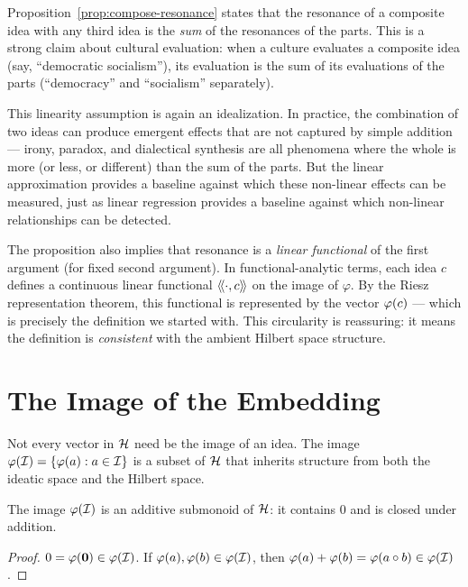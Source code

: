 \begin{interpretation}
\label{interp:linearity}
Proposition~\ref{prop:compose-resonance} states that the resonance of a
composite idea with any third idea is the \emph{sum} of the resonances of the
parts. This is a strong claim about cultural evaluation: when a culture
evaluates a composite idea (say, ``democratic socialism''), its evaluation
is the sum of its evaluations of the parts (``democracy'' and ``socialism''
separately).

This linearity assumption is again an idealization. In practice, the
combination of two ideas can produce emergent effects that are not captured by
simple addition --- irony, paradox, and dialectical synthesis are all phenomena
where the whole is more (or less, or different) than the sum of the parts. But
the linear approximation provides a baseline against which these non-linear
effects can be measured, just as linear regression provides a baseline against
which non-linear relationships can be detected.

The proposition also implies that resonance is a \emph{linear functional} of the
first argument (for fixed second argument). In functional-analytic terms, each
idea $c$ defines a continuous linear functional $\langle\!\langle \cdot, c \rangle\!\rangle$ on the image of
$\varphi$. By the Riesz representation theorem, this functional is represented
by the vector $\varphi(c)$ --- which is precisely the definition we started with.
This circularity is reassuring: it means the definition is \emph{consistent}
with the ambient Hilbert space structure.
\end{interpretation}


\section{The Image of the Embedding}

Not every vector in $\mathcal{H}$ need be the image of an idea. The image
$\varphi(\mathcal{I}) = \{\varphi(a) : a \in \mathcal{I}\}$ is a subset of $\mathcal{H}$ that
inherits structure from both the ideatic space and the Hilbert space.

\begin{proposition}
\label{prop:image-submonoid}
The image $\varphi(\mathcal{I})$ is an additive submonoid of $\mathcal{H}$: it contains
$0$ and is closed under addition.
\end{proposition}

\begin{proof}
$0 = \varphi(\mathbf{0}) \in \varphi(\mathcal{I})$. If $\varphi(a), \varphi(b) \in
\varphi(\mathcal{I})$, then $\varphi(a) + \varphi(b) = \varphi(a \circ b) \in
\varphi(\mathcal{I})$.
\end{proof}

